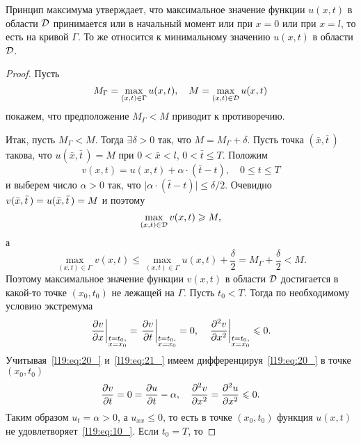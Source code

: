 Принцип максимума утверждает, что максимальное значение функции $u(x,t)$ в области $\mathcal{D}$ принимается или в начальный момент или при $x=0$ или при $x=l$, то есть на кривой $\Gamma$. То же относится к минимальному значению  $u(x,t)$ в области $\mathcal{D}$.
\begin{proof}
	Пусть
	\begin{equation*}
		 M_{\Gamma}=\max\limits_{(x,t)\in\Gamma}u(x,t),\quad M=\max\limits_{(x,t)\in\mathcal{D}}u(x,t)
	\end{equation*}
	покажем, что предположение $M_{\Gamma}<M$ приводит к противоречию.
	
	Итак, пусть $M_{\Gamma}<M$. Тогда $\exists\delta>0$ так, что $M=M_{\Gamma}+\delta$. Пусть точка $(\bar{x},\bar{t}\,)$ такова, что $u(\bar{x},\bar{t}\,)=M$ при $0<\bar{x}<l$, $0<\bar{t}\leqslant T$. Положим
	\begin{equation}\label{l19:eq:20_}
		 v(x,t)=u(x,t)+\alpha\cdot(\bar{t}-t),\quad 0\leqslant t\leqslant T
	\end{equation}
	и выберем число $\alpha>0$ так, что $\big|\alpha\cdot(\bar{t}-t)\big|\leqslant\delta/2$. Очевидно $v(\bar{x},\bar{t}\,)\?=u(\bar{x},\bar{t}\,)=M$ и поэтому
	\begin{equation*}
		\max\limits_{(x,t)\in\mathcal{D}}v(x,t)\geqslant M,
	\end{equation*}
	а 
	\begin{equation*}
		\max\limits_{(x,t)\in\Gamma}v(x,t)\leqslant \max\limits_{(x,t)\in\Gamma}u(x,t)+\frac{\delta}{2}=M_{\Gamma}+\frac{\delta}{2}<M.
	\end{equation*} 
	Поэтому максимальное значение функции $v(x,t)$ в области $\mathcal{D}$ достигается в какой-то точке $(x_0,t_0)$ не лежащей на $\Gamma$. Пусть $t_0<T$. Тогда по необходимому условию экстремума 
	\begin{equation}\label{l19:eq:21_}
		\left.\frac{\partial v}{\partial x}\right|_{\substack{t=t_0,\\ x=x_0}}=\left.\frac{\partial v}{\partial t}\right|_{\substack{t=t_0,\\ x=x_0}}=0,\quad \left.\frac{\partial^2v}{\partial x^2}\right|_{\substack{t=t_0,\\ x=x_0}}\leqslant0.
	\end{equation}
	Учитывая~\eqref{l19:eq:20_} и~\eqref{l19:eq:21_} имеем дифференцируя~\eqref{l19:eq:20_} в точке $(x_0,t_0)$
	\begin{equation*}
		\frac{\partial v}{\partial t}=0=\frac{\partial u}{\partial t}-\alpha,\quad\frac{\partial^2v}{\partial x^2}=\frac{\partial^2u}{\partial x^2}\leqslant0.
	\end{equation*}
	Таким образом $u_t=\alpha>0$, а $u_{xx}\leqslant0$, то есть в точке $(x_0,t_0)$ функция $u(x,t)$ не удовлетворяет~\eqref{l19:eq:10_}. Если $t_0=T$, то

\end{proof}

